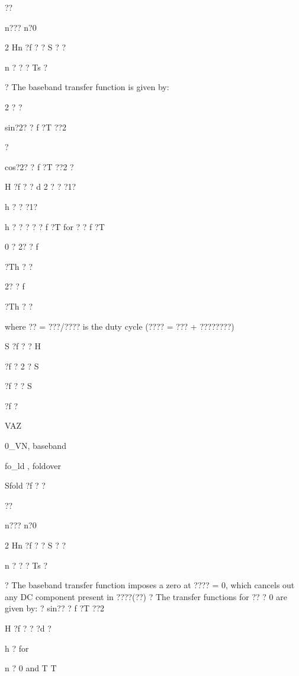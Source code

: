\documentclass[2pt,landscape]{article}
\begin{document}
\begin{multicols*}{5}
??

n???
n?0


2
Hn ?f ? ? S	?
?


n ?
?	?
Ts ?



?	The baseband transfer function is given by:


2	? ?


sin?2? ? f ?T  ??2

?


cos?2? ? f ?T  ??2 ?


H ?f ?	? d 2 ? ? ?1?


h ?	? ?1?


h ? ? ? ? ? f ?T	for
? ? f 
?T 



0	?	2? ? f


?Th	?	?


2? ? f


?Th	? ?



where ?? = ???/???? is the duty cycle (???? = ??? + ????????)






S	?f ? ? H


?f ? 2 ? S


?f ? ? S


?f ?


VAZ


0\textbullet \textbullet \_\textbullet VN\textbullet ,
baseband


\textbullet fo\_ld \textbullet ,
foldover







Sfold ?f ? ?


??

n???
n?0


2
Hn ?f ? ? S	?
?


n ?
?	?
Ts ?










?	The baseband transfer function imposes a zero at ???? = 0, which cancels 
out any DC component present in ????(??)
?	The transfer functions for ?? ? 0 are given by:
?	sin?? ? f ?T  ??2


H ?f ?	? ?d ?


h ?	for


n ? 0	and	T	\textbullet T



\end{multicols*}
\end{document}
